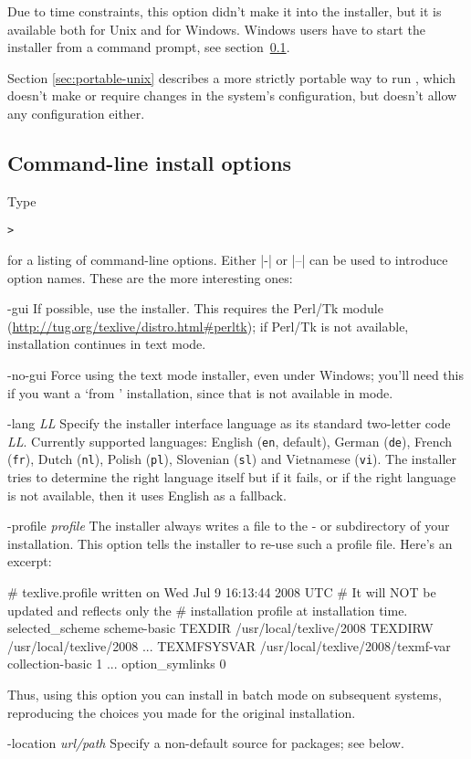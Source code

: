 \documentclass{article}
\begin{document}
Due to time constraints, this option didn't make it into the \GUI{}
installer, but it is available both for Unix and for
Windows. Windows users have to start the installer from a command
prompt, see section~\ref{sec:cmdline}.

Section \ref{sec:portable-unix} describes a more strictly portable
way to run \TL, which doesn't make or require changes in the
system's configuration, but doesn't allow any configuration either.

\subsection{Command-line install options}
\label{sec:cmdline}

Type
\begin{alltt}
> 
\end{alltt}
for a listing of command-line options.  Either |-| or |--| can be used
to introduce option names.  These are the more
interesting ones:

\begin{ttdescription}
\item[-gui] If possible, use the \GUI{} installer. This requires the
  Perl/Tk module (\url{http://tug.org/texlive/distro.html#perltk});
  if Perl/Tk is not available, installation continues in text mode.
\item[-no-gui] Force using the text mode installer, even under
  Windows; you'll need this if you want a `from \DVD' installation,
  since that is not available in \GUI{} mode.
\item[-lang {\sl LL}] Specify the installer interface
  language as its standard two-letter code \textsl{LL}. Currently
  supported languages: English (\texttt{en}, default), German
  (\texttt{de}), French (\texttt{fr}), Dutch (\texttt{nl}), Polish
  (\texttt{pl}), Slovenian (\texttt{sl}) and Vietnamese
  (\texttt{vi}). The installer tries to determine the right language
  itself but if it fails, or if the right language is not available,
  then it uses English as a fallback.
\item[-profile {\sl profile}] The installer always writes a file
   to the - or
   subdirectory of your installation.  This option tells
  the installer to re-use such a profile file.  Here's an excerpt:
  \begin{fverbatim}
# texlive.profile written on Wed Jul  9 16:13:44 2008 UTC
# It will NOT be updated and reflects only the
# installation profile at installation time.
selected_scheme scheme-basic
TEXDIR /usr/local/texlive/2008
TEXDIRW /usr/local/texlive/2008
...
TEXMFSYSVAR /usr/local/texlive/2008/texmf-var
collection-basic 1
...
option_symlinks 0
  \end{fverbatim}
  Thus, using this option you can install in batch mode on
  subsequent systems, reproducing the choices you made for the
  original installation.
\item [-location {\sl url/path}] Specify a non-default source for
  packages; see below.
\end{ttdescription}
\end{document}
